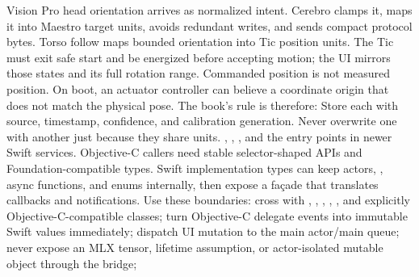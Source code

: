 {}Vision Pro head orientation arrives as normalized intent. Cerebro clamps it, maps it into Maestro target units, avoids redundant writes, and sends compact protocol bytes. Torso follow maps bounded orientation into Tic position units. The Tic must exit safe start and be energized before accepting motion; the UI mirrors those states and its full rotation range.\markdownRendererParagraphSeparator
{}Commanded position is not measured position. On boot, an actuator controller can believe a coordinate origin that does not match the physical pose. The book's rule is therefore:\markdownRendererInterblockSeparator
{}\markdownRendererInterblockSeparator
{}Store each with source, timestamp, confidence, and calibration generation. Never overwrite one with another just because they share units.\markdownRendererInterblockSeparator
{}
\markdownRendererSectionEnd \markdownRendererSectionBegin
{}\markdownRendererInterblockSeparator
{}\markdownRendererBlockQuoteBegin
{} , , , and the  entry points in newer Swift services.\markdownRendererBlockQuoteEnd \markdownRendererInterblockSeparator
{}Objective-C callers need stable selector-shaped APIs and Foundation-compatible types. Swift implementation types can keep actors, , async functions, and enums internally, then expose a façade that translates callbacks and notifications.\markdownRendererParagraphSeparator
{}Use these boundaries:\markdownRendererInterblockSeparator
{}\markdownRendererUlBegin
\markdownRendererUlItem cross with , , , , , and explicitly Objective-C-compatible classes;\markdownRendererUlItemEnd 
\markdownRendererUlItem turn Objective-C delegate events into immutable Swift values immediately;\markdownRendererUlItemEnd 
\markdownRendererUlItem dispatch UI mutation to the main actor/main queue;\markdownRendererUlItemEnd 
\markdownRendererUlItem never expose an MLX tensor,  lifetime assumption, or actor-isolated mutable object through the bridge;\markdownRendererUlItemEnd 
